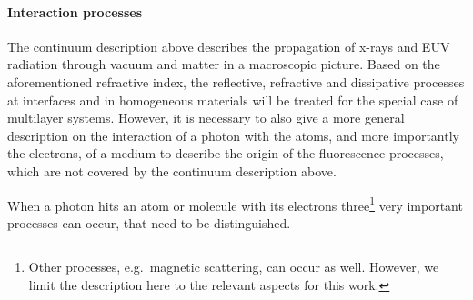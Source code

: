 \paragraph{Interaction processes}
The continuum description above describes the propagation of x-rays and EUV radiation through vacuum and matter in a macroscopic picture. Based on the aforementioned refractive index, the reflective, refractive and dissipative processes at interfaces and in homogeneous materials will be treated for the special case of multilayer systems. However, it is necessary to also give a more general description on the interaction of a photon with the atoms, and more importantly the electrons, of a medium to describe the origin of the fluorescence processes, which are not covered by the continuum description above.

When a photon hits an atom or molecule with its electrons three\footnote{Other processes, e.g.~magnetic scattering, can occur as well. However, we limit the description here to the relevant aspects for this work.} very important processes can occur, that need to be distinguished.
